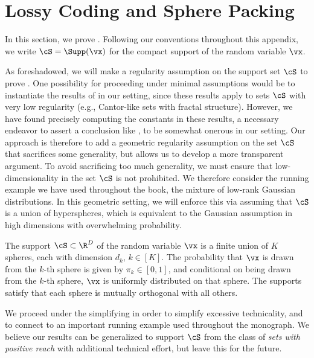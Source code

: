 \documentclass[../../book-main.tex]{subfiles}
\begin{document}
\section{Lossy Coding and Sphere Packing}\label{app:rate-distortion-covering}

In this section, we prove .
Following our conventions throughout this appendix, we write $\cS = \Supp(\vx)$
for the compact support of the random variable $\vx$.

As foreshadowed, we will make a regularity assumption on the support set $\cS$
to prove . One possibility for
proceeding under minimal assumptions would be to instantiate the results of
\cite{Riegler2018-jh,Riegler2023-rr} in our setting, since these results apply
to sets $\cS$ with very low regularity (e.g., Cantor-like sets with fractal
structure). However, we have found precisely computing the constants in these
results, a necessary endeavor to assert a conclusion like
, to be somewhat onerous in our
setting.
Our approach is therefore to add a geometric regularity assumption on
the set $\cS$ that sacrifices some generality, but allows us to develop
a more transparent argument. To avoid sacrificing too much generality, we must
ensure that low-dimensionality in the set $\cS$ is not prohibited. 
We therefore consider the running example we have used throughout the book, the
mixture of low-rank Gaussian distributions. In this geometric setting, we will
enforce this via assuming that $\cS$ is a union of hyperspheres, which is
equivalent to the Gaussian assumption in high dimensions with overwhelming
probability.

\begin{assumption}\label{assumption:union-of-spheres}
    The support $\cS \subset \R^D$ of the random variable $\vx$ is a finite
    union of $K$ spheres, each with dimension $d_k$, $k \in [K]$.
    The probability that $\vx$ is drawn from the $k$-th sphere is given by
    $\pi_k \in [0, 1]$, and conditional on being drawn from the $k$-th sphere,
    $\vx$ is uniformly distributed on that sphere.
    The supports satisfy that each sphere is mutually orthogonal with all
    others.
\end{assumption}

We proceed under the simplifying  in order to
simplify excessive technicality, and to connect to an important running example
used throughout the monograph. We believe our results can be generalized to
support $\cS$ from the class of \textit{sets with positive reach} with
additional technical effort, but leave this for the future.
\end{document}
